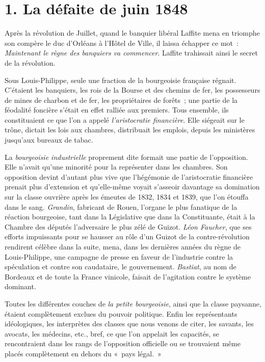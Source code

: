 \documentclass[twoside]{book} %
\begin{document}
\section[{1. La défaite de juin 1848}]{1. La défaite de juin 1848}

\noindent Après la révolution de Juillet, quand le banquier libéral Laffite mena en triomphe son compère le duc d’Orléans à l’Hôtel de Ville, il laissa échapper ce mot : \emph{Maintenant le règne des banquiers va commencer}. Laffite trahissait ainsi le secret de la révolution.\par
Sous Louis-Philippe, seule une fraction de la bourgeoisie française régnait. C’étaient les banquiers, les rois de la Bourse et des chemins de fer, les possesseurs de mines de charbon et de fer, les propriétaires de forêts ; une partie de la féodalité foncière s’était en effet ralliée aux premiers. Tous ensemble, ils constituaient ce que l’on a appelé \emph{l’aristocratie financière}. Elle siégeait sur le trône, dictait les lois aux chambres, distribuait les emplois, depuis les ministères jusqu’aux bureaux de tabac.\par
La \emph{bourgeoisie industrielle} proprement dite formait une partie de l’opposition. Elle n’avait qu’une minorité pour la représenter dans les chambres. Son opposition devint d’autant plus vive que l’hégémonie de l’aristocratie financière prenait plus d’extension et qu’elle-même voyait s’asseoir davantage sa domination sur la classe ouvrière après les émeutes de 1832, 1834 et 1839, que l’on étouffa dans le sang. \emph{Grandin}, fabricant de Rouen, l’organe le plus fanatique de la réaction bourgeoise, tant dans la Législative que dans la Constituante, était à la Chambre des députés l’adversaire le plus zélé de Guizot. \emph{Léon Faucher}, que ses efforts impuissants pour se hausser au rôle d’un Guizot de la contre-révolution rendirent célèbre dans la suite, mena, dans les dernières années du règne de Louis-Philippe, une campagne de presse en faveur de l’industrie contre la spéculation et contre son caudataire, le gouvernement. \emph{Bastiat}, au nom de Bordeaux et de toute la France vinicole, faisait de l’agitation contre le système dominant.\par
Toutes les différentes couches de \emph{la petite bourgeoisie}, ainsi que la classe paysanne, étaient complètement exclues du pouvoir politique. Enfin les représentants idéologiques, les interprètes des classes que nous venons de citer, les savants, les avocats, les médecins, etc., bref, ce que l’on appelait les capacités, se rencontraient dans les rangs de l’opposition officielle ou se trouvaient même placés complètement en dehors du « pays légal. »\par
\end{document}
